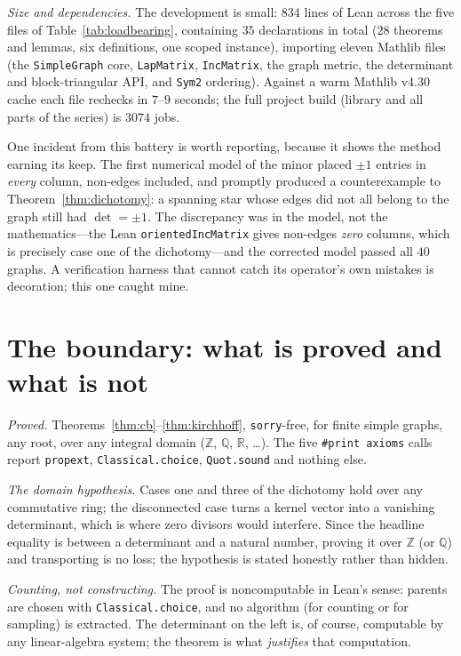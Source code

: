 \documentclass[11pt]{article}
\newcommand{\lean}[1]{\texttt{#1}}
\newcommand{\Z}{\mathbb{Z}}
\newcommand{\R}{\mathbb{R}}
\begin{document}
\emph{Size and dependencies.} The development is small: $834$ lines of Lean across the five
files of Table~\ref{tab:loadbearing}, containing $35$ declarations in total ($28$ theorems and
lemmas, six definitions, one scoped instance), importing eleven Mathlib files (the
\lean{SimpleGraph} core, \lean{LapMatrix}, \lean{IncMatrix}, the graph metric, the determinant
and block-triangular API, and \lean{Sym2} ordering). Against a warm Mathlib v4.30 cache each
file rechecks in $7$--$9$ seconds; the full project build (library and all parts of the series)
is $3074$ jobs.

One incident from this battery is worth reporting, because it shows the method earning its keep.
The first numerical model of the minor placed $\pm1$ entries in \emph{every} column, non-edges
included, and promptly produced a counterexample to Theorem~\ref{thm:dichotomy}: a spanning
star whose edges did not all belong to the graph still had $\det=\pm1$. The discrepancy was in
the model, not the mathematics---the Lean \lean{orientedIncMatrix} gives non-edges \emph{zero}
columns, which is precisely case one of the dichotomy---and the corrected model passed all
$40$ graphs. A verification harness that cannot catch its operator's own mistakes is
decoration; this one caught mine.

\section{The boundary: what is proved and what is not}
\label{sec:boundary}

\emph{Proved.} Theorems~\ref{thm:cb}--\ref{thm:kirchhoff}, \lean{sorry}-free, for finite simple
graphs, any root, over any integral domain ($\Z$, $\mathbb Q$, $\R$, \dots). The five
\lean{\#print axioms} calls report \lean{propext}, \lean{Classical.choice}, \lean{Quot.sound}
and nothing else.

\emph{The domain hypothesis.} Cases one and three of the dichotomy hold over any commutative
ring; the disconnected case turns a kernel vector into a vanishing determinant, which is where
zero divisors would interfere. Since the headline equality is between a determinant and a
natural number, proving it over $\Z$ (or $\mathbb Q$) and transporting is no loss; the
hypothesis is stated honestly rather than hidden.

\emph{Counting, not constructing.} The proof is noncomputable in Lean's sense: parents are
chosen with \lean{Classical.choice}, and no algorithm (for counting or for sampling) is
extracted. The determinant on the left is, of course, computable by any linear-algebra system;
the theorem is what \emph{justifies} that computation.
\end{document}

